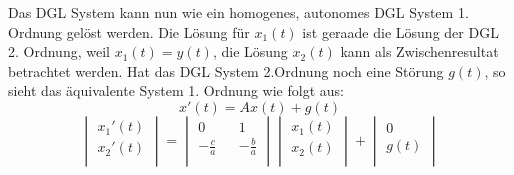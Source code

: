 Das DGL System kann nun wie ein homogenes, autonomes DGL System 1. Ordnung gelöst werden. Die Lösung für $x_1(t)$ ist geraade die Lösung der DGL 2. Ordnung, weil $x_1(t) = y(t)$, die Lösung $x_2(t)$ kann als Zwischenresultat betrachtet werden. 
Hat das DGL System 2.Ordnung noch eine Störung $g(t)$, so sieht das äquivalente System 1. Ordnung wie folgt aus:\\
\begin{equation*}
x'(t) = Ax(t) + g(t)
\end{equation*}
\begin{equation*}
	\begin{vmatrix} 
	        x_1'(t)\\ 
	        x_2'(t)\\   
	\end{vmatrix}
	=
	\begin{vmatrix} 
	        0 && 1\\ 
	       -\frac{c}{a} && -\frac{b}{a}\\   
	\end{vmatrix}
	\begin{vmatrix} 
	        x_1(t)\\ 
	        x_2(t)\\   
	\end{vmatrix}
	+
	\begin{vmatrix} 
	        0\\ 
	        g(t)\\   
	\end{vmatrix}
\end{equation*}

